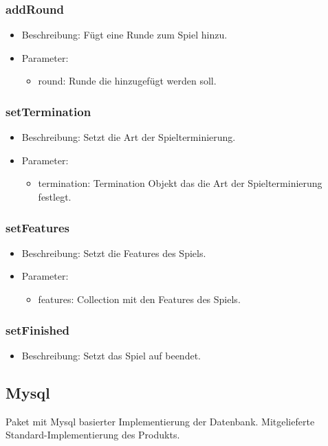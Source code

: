 \documentclass[a4paper]{scrreprt}
\begin{document}
	\subsubsection{addRound}
	\begin{itemize}
		\item Beschreibung: Fügt eine Runde zum Spiel hinzu.
		\item Parameter:
		\begin{itemize}
			\item round: Runde die hinzugefügt werden soll.
		\end{itemize}
	\end{itemize}
	
	\subsubsection{setTermination}
	\begin{itemize}
		\item Beschreibung: Setzt die Art der Spielterminierung.
		\item Parameter:
		\begin{itemize}
			\item termination: Termination Objekt das die Art der Spielterminierung festlegt.
		\end{itemize}
	\end{itemize}
	
	\subsubsection{setFeatures}
	\begin{itemize}
		\item Beschreibung: Setzt die Features des Spiels.
		\item Parameter:
		\begin{itemize}
			\item features: Collection mit den Features des Spiels.
		\end{itemize}
	\end{itemize}

	\subsubsection{setFinished}
	\begin{itemize}
		\item Beschreibung: Setzt das Spiel auf beendet.
	\end{itemize}
	
	\subsection{Mysql}
	Paket mit Mysql basierter Implementierung der Datenbank.
	Mitgelieferte Standard-Implementierung des Produkts.
	
\end{document}

